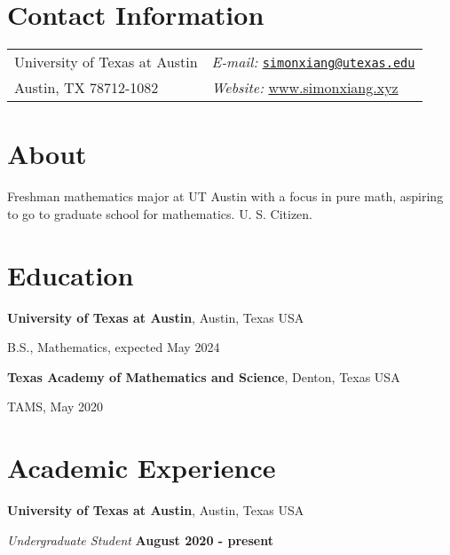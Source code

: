 \documentclass[margin,line]{res}
\newenvironment{list1}{
  \begin{list}{\ding{113}}{%
      \setlength{\itemsep}{0in}
      \setlength{\parsep}{0in} \setlength{\parskip}{0in}
      \setlength{\topsep}{0in} \setlength{\partopsep}{0in} 
      \setlength{\leftmargin}{0.17in}}}{\end{list}}
\begin{document}

\begin{resume}
\section{\sc Contact Information}
\vspace{.05in}
\begin{tabular}{@{}p{2in}p{4in}}
    University of Texas at Austin & {\it E-mail:}  \href{mailto:simonxiang@utexas.edu}{\texttt{simonxiang@utexas.edu}}\\       
    Austin, TX 78712-1082 & {\it Website:} \url{www.simonxiang.xyz}
\end{tabular}


\section{\sc About}
Freshman mathematics major at UT Austin with a focus in pure math, aspiring to go to graduate school for mathematics. U.\! S.\! Citizen. 

\section{\sc Education}
{\bf University of Texas at Austin}, Austin, Texas USA\\
\vspace*{-.1in}
\begin{list1}
\item[] B.S., Mathematics, expected May 2024 
\end{list1}

{\bf Texas Academy of Mathematics and Science}, Denton, Texas USA\\
\vspace*{-.1in}
\begin{list1}
\item[] TAMS, May 2020
\end{list1}

\section{\sc Academic Experience}
{\bf University of Texas at Austin}, Austin, Texas USA

\vspace{-.3cm}
{\em Undergraduate Student} \hfill {\bf August 2020 - present}\\


\end{resume}
\end{document}
